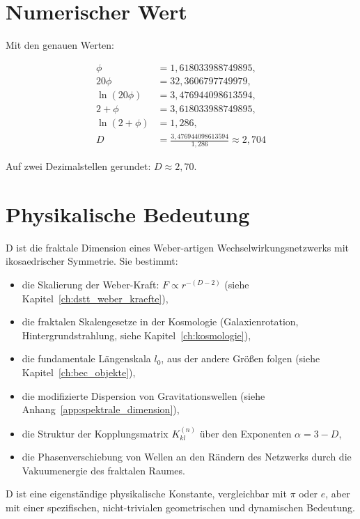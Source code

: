 \section{Numerischer Wert}
\label{sec:d_numerisch}

Mit den genauen Werten:

\begin{align*}
\phi &= 1,618033988749895, \\
20\phi &= 32,3606797749979, \\
\ln(20\phi) &= 3,476944098613594, \\
2 + \phi &= 3,618033988749895, \\
\ln(2 + \phi) &= 1,286, \\
D &= \frac{3,476944098613594}{1,286} \approx 2,704
\end{align*}

Auf zwei Dezimalstellen gerundet: \( D \approx 2,70 \).

\section{Physikalische Bedeutung}
\label{sec:d_bedeutung}

D ist die fraktale Dimension eines Weber-artigen Wechselwirkungsnetzwerks mit ikosaedrischer Symmetrie. Sie bestimmt:

\begin{itemize}
    \item die Skalierung der Weber-Kraft: \( F \propto r^{-(D-2)} \) (siehe Kapitel~\ref{ch:dstt_weber_kraefte}),
    \item die fraktalen Skalengesetze in der Kosmologie (Galaxienrotation, Hintergrundstrahlung, siehe Kapitel~\ref{ch:kosmologie}),
    \item die fundamentale Längenskala \( l_0 \), aus der andere Größen folgen (siehe Kapitel~\ref{ch:bec_objekte}),
    \item die modifizierte Dispersion von Gravitationswellen (siehe Anhang~\ref{app:spektrale_dimension}),
    \item die Struktur der Kopplungsmatrix \( K_{kl}^{(n)} \) über den Exponenten \( \alpha = 3 - D \),
    \item die Phasenverschiebung von Wellen an den Rändern des Netzwerks durch die Vakuumenergie des fraktalen Raumes.
\end{itemize}

D ist eine eigenständige physikalische Konstante, vergleichbar mit \( \pi \) oder \( e \), aber mit einer spezifischen, nicht-trivialen geometrischen und dynamischen Bedeutung.

